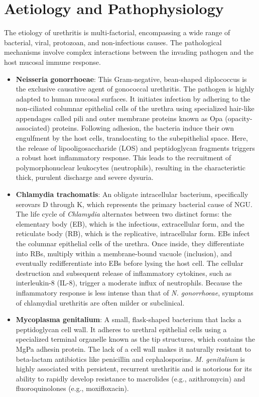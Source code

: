 \section*{Aetiology and Pathophysiology}
The etiology of urethritis is multi-factorial, encompassing a wide range of bacterial, viral, protozoan, and non-infectious causes. The pathological mechanisms involve complex interactions between the invading pathogen and the host mucosal immune response.

\begin{itemize}
    \item \textbf{Neisseria gonorrhoeae}: This Gram-negative, bean-shaped diplococcus is the exclusive causative agent of gonococcal urethritis. The pathogen is highly adapted to human mucosal surfaces. It initiates infection by adhering to the non-ciliated columnar epithelial cells of the urethra using specialized hair-like appendages called pili and outer membrane proteins known as Opa (opacity-associated) proteins. Following adhesion, the bacteria induce their own engulfment by the host cells, translocating to the subepithelial space. Here, the release of lipooligosaccharide (LOS) and peptidoglycan fragments triggers a robust host inflammatory response. This leads to the recruitment of polymorphonuclear leukocytes (neutrophils), resulting in the characteristic thick, purulent discharge and severe dysuria.

    \item \textbf{Chlamydia trachomatis}: An obligate intracellular bacterium, specifically serovars D through K, which represents the primary bacterial cause of NGU. The life cycle of \textit{Chlamydia} alternates between two distinct forms: the elementary body (EB), which is the infectious, extracellular form, and the reticulate body (RB), which is the replicative, intracellular form. EBs infect the columnar epithelial cells of the urethra. Once inside, they differentiate into RBs, multiply within a membrane-bound vacuole (inclusion), and eventually redifferentiate into EBs before lysing the host cell. The cellular destruction and subsequent release of inflammatory cytokines, such as interleukin-8 (IL-8), trigger a moderate influx of neutrophils. Because the inflammatory response is less intense than that of \textit{N. gonorrhoeae}, symptoms of chlamydial urethritis are often milder or subclinical.

    \item \textbf{Mycoplasma genitalium}: A small, flask-shaped bacterium that lacks a peptidoglycan cell wall. It adheres to urethral epithelial cells using a specialized terminal organelle known as the tip structures, which contains the MgPa adhesin protein. The lack of a cell wall makes it naturally resistant to beta-lactam antibiotics like penicillin and cephalosporins. \textit{M. genitalium} is highly associated with persistent, recurrent urethritis and is notorious for its ability to rapidly develop resistance to macrolides (e.g., azithromycin) and fluoroquinolones (e.g., moxifloxacin).


\end{itemize}
